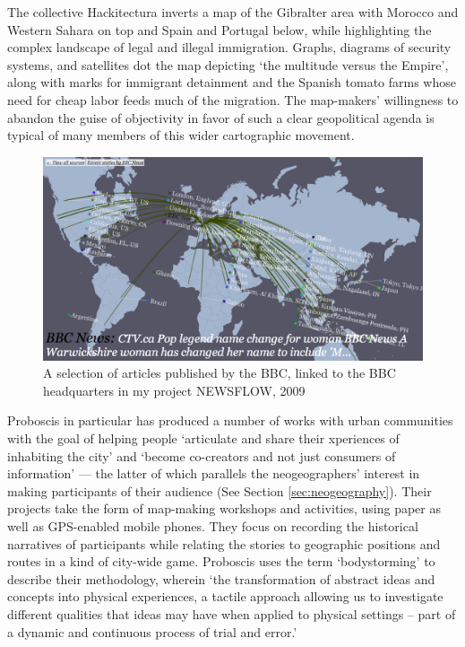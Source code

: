 \documentclass[11pt]{report}
\begin{document}
The collective Hackitectura inverts a map of the Gibralter area with Morocco and Western Sahara on top and Spain and Portugal below, while highlighting the complex landscape of legal and illegal immigration. Graphs, diagrams of security systems, and satellites dot the map depicting `the multitude versus the Empire', along with marks for immigrant detainment and the Spanish tomato farms whose need for cheap labor feeds much of the migration. The map-makers' willingness to abandon the guise of objectivity in favor of such a clear geopolitical agenda is typical of many members of this wider cartographic movement.  

\begin{figure}[h]
	\begin{center}
		\includegraphics[width=1\textwidth]{images/newsflow.png}
		\caption{A selection of articles published by the BBC, linked to the BBC headquarters in my project NEWSFLOW, 2009}
	\end{center}
\end{figure}

Proboscis in particular has produced a number of works with urban communities with the goal of helping people `articulate and share their xperiences of inhabiting the city' and `become co-creators and not just consumers of information' --- the latter of which parallels the neogeographers' interest in making participants of their audience (See Section \ref{sec:neogeography}). Their projects take the form of map-making workshops and activities, using paper as well as GPS-enabled mobile phones. They focus on recording the historical narratives of participants while relating the stories to geographic positions and routes in a kind of city-wide game. Proboscis uses the term `bodystorming' to describe their methodology, wherein `the transformation of abstract ideas and concepts into physical experiences, a tactile approach allowing us to investigate different qualities that ideas may have when applied to physical settings – part of a dynamic and continuous process of trial and error.' \cite{proboscis2003bodystorming} 
\end{document}
